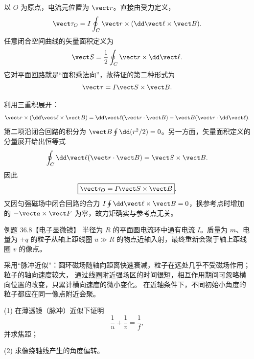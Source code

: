 \begin{xesolution}
以 $O$ 为原点，电流元位置为 $\vect r$。直接由受力定义，
\begin{equation}
  \vect\tau_O=I\oint_C\vect r\times
  (\dd\vect\ell\times\vect B).
\end{equation}
任意闭合空间曲线的矢量面积定义为
\begin{equation}
  \vect S=\frac12\oint_C\vect r\times\dd\vect\ell.
\end{equation}
它对平面回路就是“面积乘法向”，故待证的第二种形式为
\[
  \vect\tau=I\vect S\times\vect B.
\]

利用三重积展开：
\[
  \vect r\times(\dd\vect\ell\times\vect B)
  =\dd\vect\ell(\vect r\cdot\vect B)
  -\vect B(\vect r\cdot\dd\vect\ell).
\]
第二项沿闭合回路的积分为
$\vect B\oint\dd(r^2/2)=0$。另一方面，矢量面积定义的分量展开给出恒等式
\[
  \oint_C\dd\vect\ell(\vect r\cdot\vect B)=\vect S\times\vect B.
\]
因此
\begin{equation}
  \boxed{\vect\tau_O=I\vect S\times\vect B}.
\end{equation}
又因匀强磁场中闭合回路的合力
$I\oint\dd\vect\ell\times\vect B=0$，换参考点时增加的
$-\vect a\times\vect F$ 为零，故力矩确实与参考点无关。

\loopTorqueDiagram
\end{xesolution}

\Needspace{0.18\textheight}
\begin{origexamplebox}{例题 36.8【电子显微镜】}
半径为 $R$ 的平面圆电流环中通有电流 $I$。质量为 $m$、电量为 $+q$ 的粒子从轴上距线圈
$u\gg R$ 的物点近轴入射，最终重新会聚于轴上距线圈 $v$ 的像点。

采用“脉冲近似”：圆环磁场随轴向距离快速衰减，粒子在远处几乎不受磁场作用；粒子的轴向速度较大，
通过线圈附近强场区的时间很短，相互作用期间可忽略横向位置的改变，只累计横向速度的微小变化。
在近轴条件下，不同初始小角度的粒子都应在同一像点附近会聚。

(1) 在薄透镜（脉冲）近似下证明
\[
  \frac1u+\frac1v=\frac1f,
\]
并求焦距；

(2) 求像绕轴线产生的角度偏转。
\end{origexamplebox}

